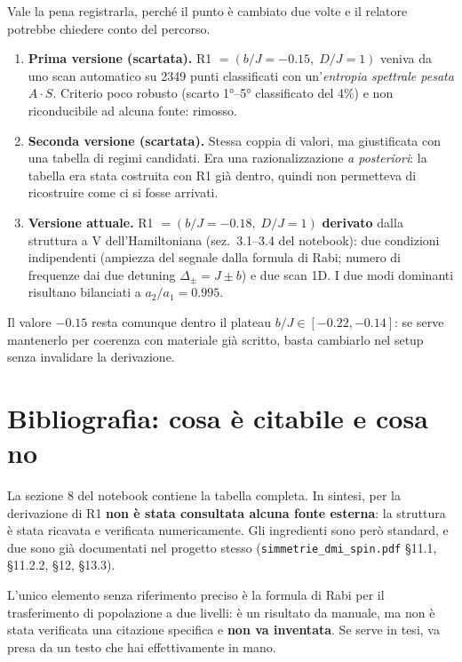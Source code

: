 \documentclass[11pt,a4paper]{article}
\begin{document}
Vale la pena registrarla, perché il punto è cambiato due volte e il
relatore potrebbe chiedere conto del percorso.

\begin{enumerate}[leftmargin=1.4em,itemsep=0.3em]
\item \textbf{Prima versione (scartata).} R1
$=(b/J=-0.15,\;D/J=1)$ veniva da uno scan automatico su 2349 punti
classificati con un'\emph{entropia spettrale pesata} $A\cdot S$.
Criterio poco robusto (scarto 1°--5° classificato del 4\%) e non
riconducibile ad alcuna fonte: rimosso.
\item \textbf{Seconda versione (scartata).} Stessa coppia di valori, ma
giustificata con una tabella di regimi candidati. Era una
razionalizzazione \emph{a posteriori}: la tabella era stata costruita
con R1 già dentro, quindi non permetteva di ricostruire come ci si
fosse arrivati.
\item \textbf{Versione attuale.} R1 $=(b/J=-0.18,\;D/J=1)$
\textbf{derivato} dalla struttura a V dell'Hamiltoniana (sez.~3.1--3.4
del notebook): due condizioni indipendenti (ampiezza del segnale dalla
formula di Rabi; numero di frequenze dai due detuning
$\Delta_\pm=J\pm b$) e due scan 1D. I due modi dominanti risultano
bilanciati a $a_2/a_1=0.995$.
\end{enumerate}

Il valore $-0.15$ resta comunque dentro il plateau
$b/J\in[-0.22,-0.14]$: se serve mantenerlo per coerenza con materiale
già scritto, basta cambiarlo nel setup senza invalidare la derivazione.

\section{Bibliografia: cosa è citabile e cosa no}

La sezione 8 del notebook contiene la tabella completa. In sintesi, per
la derivazione di R1 \textbf{non è stata consultata alcuna fonte
esterna}: la struttura è stata ricavata e verificata numericamente. Gli
ingredienti sono però standard, e due sono già documentati nel progetto
stesso (\texttt{simmetrie\_dmi\_spin.pdf} \S 11.1, \S 11.2.2, \S 12,
\S 13.3).

\begin{editnote}
L'unico elemento senza riferimento preciso è la formula di Rabi per il
trasferimento di popolazione a due livelli: è un risultato da manuale,
ma non è stata verificata una citazione specifica e \textbf{non va
inventata}. Se serve in tesi, va presa da un testo che hai
effettivamente in mano.
\end{editnote}
\end{document}
